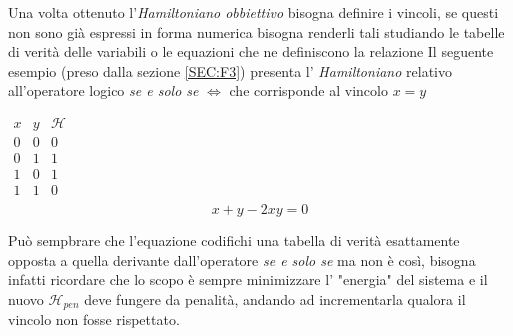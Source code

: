 \documentclass[a4paper]{article}
\begin{document}
Una volta ottenuto l'\textit{Hamiltoniano obbiettivo} bisogna definire i vincoli, se questi non sono già espressi in forma numerica bisogna renderli tali studiando le tabelle di verità delle variabili o le equazioni che ne definiscono la relazione
Il seguente esempio (preso dalla sezione \ref{SEC:F3}) presenta l' \textit{Hamiltoniano} relativo all'operatore logico \textit{se e solo se} $ \Leftrightarrow$ che corrisponde al vincolo $x=y$ 
\begin{center}$\begin{array}{c|c|c}
 x & y & \mathcal{H}\\
\hline
 0 & 0 & 0  \\
 0 & 1 & 1  \\
 1 & 0 & 1  \\
 1 & 1 & 0  \\ 
\end{array}$
$$ x + y -2xy = 0$$
\end{center}
Può sempbrare che l'equazione codifichi una tabella di verità esattamente opposta a quella derivante dall'operatore \textit{se e solo se} ma non è così, bisogna infatti ricordare che lo scopo è sempre minimizzare l' "energia" del sistema e il nuovo $\mathcal{H}_{pen}$ deve fungere da penalità, andando ad incrementarla qualora il vincolo non fosse rispettato.
\end{document}
